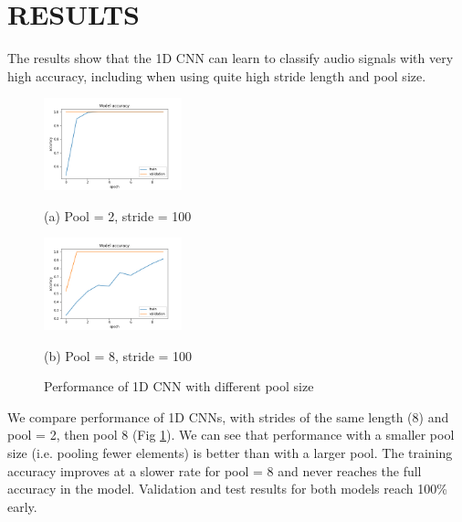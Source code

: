 \documentclass{article}
\begin{document}
\section{RESULTS}
\label{sec:results}
%
The results show that the 1D CNN can learn to classify audio signals with very high accuracy, including when using quite high stride length and pool size.  

\begin{figure}[htb]
\begin{minipage}[b]{.48\linewidth}
  \centering
  \centerline{\includegraphics[width=4cm]{pool2}}
  \centerline{(a) Pool = 2, stride = 100}
\end{minipage}
\begin{minipage}[b]{.48\linewidth}
  \centering
  \centerline{\includegraphics[width=4cm]{pool8}}
  \centerline{(b) Pool = 8, stride = 100}
\end{minipage}
%
\caption{Performance of 1D CNN with different pool size}
\label{fig:res1_2}
%
\end{figure}

We compare performance of 1D CNNs, with strides of the same length (8) and pool = 2, then pool 8 (Fig \ref{fig:res1_2}).  We can see that performance with a smaller pool size (i.e. pooling fewer elements) is better than with a larger pool.  The training accuracy improves at a slower rate for pool = 8 and never reaches the full accuracy in the model.  Validation and test results for both models reach 100\% early.  
\end{document}
